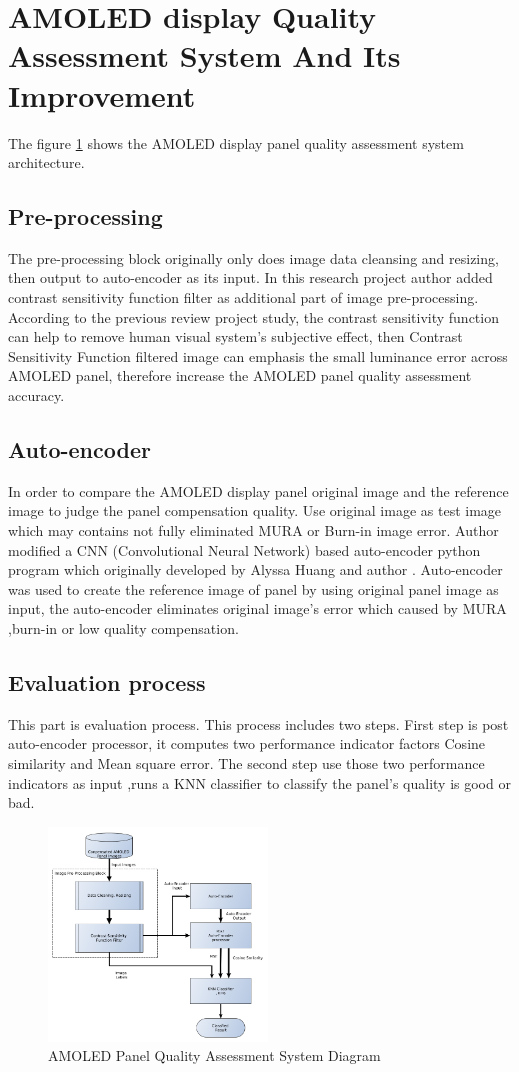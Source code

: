 \documentclass{article}
\begin{document}
\section{AMOLED display Quality Assessment System And Its Improvement }
The figure \ref{fig_sys_diagram} shows the AMOLED display panel quality assessment system architecture. 
\subsection{Pre-processing}
The pre-processing block originally only does image data cleansing and resizing, then output to auto-encoder as its input. In this research project author added contrast sensitivity function filter as additional part of image pre-processing. According to the previous review project study, the contrast sensitivity function can help to remove human visual system's subjective effect, then Contrast Sensitivity Function filtered image can emphasis the small luminance error across AMOLED panel, therefore increase the AMOLED panel quality assessment accuracy. 
\subsection{Auto-encoder}
In order to compare the AMOLED display panel original image and the reference image to judge the panel compensation quality. Use original image as test image which may contains not fully eliminated MURA or Burn-in image error. Author modified a CNN (Convolutional Neural Network) based auto-encoder python program which originally developed by Alyssa Huang and author \cite{657A_report}. Auto-encoder was used  to create the reference image of panel by using original panel image as input, the auto-encoder eliminates original image's error which caused by MURA ,burn-in or low quality compensation.  
\subsection{Evaluation process}
This part is evaluation process. This process includes two steps. First step is post auto-encoder processor, it computes two performance indicator factors Cosine similarity and Mean square error. The second step use those two performance indicators as input ,runs a KNN classifier to classify the panel's quality is good or bad.
\begin{figure}[h]
    \centering
    \includegraphics[width=0.52\textwidth]{images/system_diagram.png}\vfill
    \caption{AMOLED Panel Quality Assessment System Diagram}
    \label{fig_sys_diagram}
\end{figure}
\end{document}

